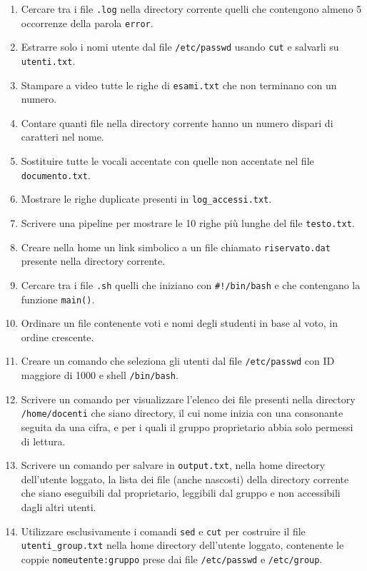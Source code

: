 \documentclass{report}
\begin{document}
\begin{enumerate}
    \item Cercare tra i file \texttt{.log} nella directory corrente quelli che contengono almeno 5 occorrenze della parola \texttt{error}.
    \item Estrarre solo i nomi utente dal file \texttt{/etc/passwd} usando \texttt{cut} e salvarli su \texttt{utenti.txt}.
    \item Stampare a video tutte le righe di \texttt{esami.txt} che non terminano con un numero.
    \item Contare quanti file nella directory corrente hanno un numero dispari di caratteri nel nome.
    \item Sostituire tutte le vocali accentate con quelle non accentate nel file \texttt{documento.txt}.
    \item Mostrare le righe duplicate presenti in \texttt{log\_accessi.txt}.
    \item Scrivere una pipeline per mostrare le 10 righe più lunghe del file \texttt{testo.txt}.
    \item Creare nella home un link simbolico a un file chiamato \texttt{riservato.dat} presente nella directory corrente.
    \item Cercare tra i file \texttt{.sh} quelli che iniziano con \texttt{\#!/bin/bash} e che contengano la funzione \texttt{main()}.
    \item Ordinare un file contenente voti e nomi degli studenti in base al voto, in ordine crescente.
    \item Creare un comando che seleziona gli utenti dal file \texttt{/etc/passwd} con ID maggiore di 1000 e shell \texttt{/bin/bash}.
    \item Scrivere un comando per visualizzare l’elenco dei file presenti nella directory \texttt{/home/docenti} che siano directory, il cui nome inizia con una consonante seguita da una cifra, e per i quali il gruppo proprietario abbia solo permessi di lettura.
    
    \item Scrivere un comando per salvare in \texttt{output.txt}, nella home directory dell’utente loggato, la lista dei file (anche nascosti) della directory corrente che siano eseguibili dal proprietario, leggibili dal gruppo e non accessibili dagli altri utenti.
    
    \item Utilizzare esclusivamente i comandi \texttt{sed} e \texttt{cut} per costruire il file \texttt{utenti\_group.txt} nella home directory dell’utente loggato, contenente le coppie \texttt{nomeutente:gruppo} prese dai file \texttt{/etc/passwd} e \texttt{/etc/group}.
    

\end{enumerate}
\end{document}
